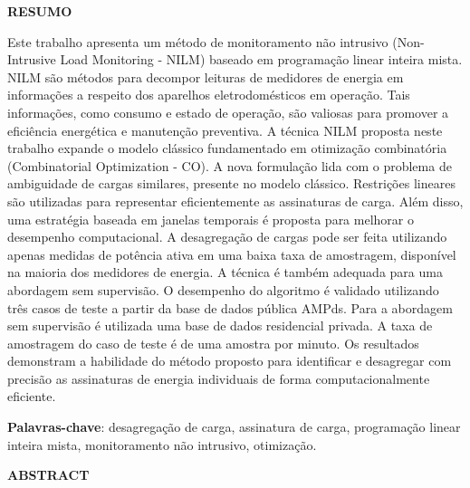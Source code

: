     
\newpage

\begin{center}
  \large{\textbf{RESUMO}}
\end{center}

Este trabalho apresenta um método de monitoramento não intrusivo (Non-Intrusive Load Monitoring - NILM) baseado em programação linear inteira mista. NILM são métodos para decompor leituras de medidores de energia em informações a respeito dos aparelhos eletrodomésticos em operação. Tais informações, como consumo e estado de operação, são valiosas para promover a eficiência energética e manutenção preventiva. A técnica NILM proposta neste trabalho expande o modelo clássico fundamentado em otimização combinatória (Combinatorial Optimization - CO). A nova formulação lida com o problema de ambiguidade de cargas similares, presente no modelo clássico. Restrições lineares são utilizadas para representar eficientemente as assinaturas de carga. Além disso, uma estratégia baseada em janelas temporais é proposta para melhorar o desempenho computacional. A desagregação de cargas pode ser feita utilizando apenas medidas de potência ativa em uma baixa taxa de amostragem, disponível na maioria dos medidores de energia. A técnica é também adequada para uma abordagem sem supervisão. O desempenho do algoritmo é validado utilizando três casos de teste a partir da base de dados pública AMPds. Para a abordagem sem supervisão é utilizada uma base de dados residencial privada. A taxa de amostragem do caso de teste é de uma amostra por minuto. Os resultados demonstram a habilidade do método proposto para identificar e desagregar com precisão as assinaturas de energia individuais de forma computacionalmente eficiente. 

\vspace{.2cm}
\textbf{Palavras-chave}:
desagregação de carga, assinatura de carga, programação linear inteira mista, monitoramento não intrusivo, otimização.

\vspace{3cm}
\newpage

\begin{center}
  \large{\textbf{ABSTRACT}}
\end{center}

